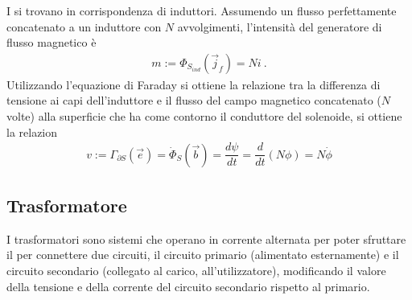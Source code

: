 \documentclass[letterpaper,10pt,italian]{jupyterBook}
\begin{document}
\sphinxAtStartPar
I  si trovano in corrispondenza di induttori. Assumendo un flusso perfettamente concatenato a un induttore con \(N\) avvolgimenti, l’intensità del generatore di flusso magnetico è
\begin{equation*}
\begin{split}m := \Phi_{S_{ind}}(\vec{j}_f) = N i \ .\end{split}
\end{equation*}
\sphinxAtStartPar
Utilizzando l’equazione di Faraday si ottiene la relazione tra la differenza di tensione ai capi dell’induttore e il flusso del campo magnetico concatenato (\(N\) volte) alla superficie che ha come contorno il conduttore del solenoide, si ottiene la relazion
\begin{equation}\label{equation:ch/electromagnetism/circuits-magnetic:eq:v-phi}
\begin{split}v := \Gamma_{\partial S}(\vec{e}) = \dot{\Phi}_{S}(\vec{b}) = \dfrac{d \psi}{dt} = \dfrac{d}{dt} \left( N \phi \right) = N \dot{\phi} \end{split}
\end{equation}





\subsection{Trasformatore}
\label{\detokenize{ch/electromagnetism/circuits-magnetic:trasformatore}}\label{\detokenize{ch/electromagnetism/circuits-magnetic:physics-hs-electromagnetism-circuits-magnetic-transformer}}
\sphinxAtStartPar
I trasformatori sono sistemi che operano in corrente alternata per poter sfruttare il {\hyperref[\detokenize{ch/electromagnetism/electromagnetism-general:physics-hs-electromagnetism-electromagnetism-general-em-induction}]{}} per connettere due circuiti, il circuito primario (alimentato esternamente) e il circuito secondario (collegato al carico, all’utilizzatore), modificando il valore della tensione e della corrente del circuito secondario rispetto al primario.
\end{document}
